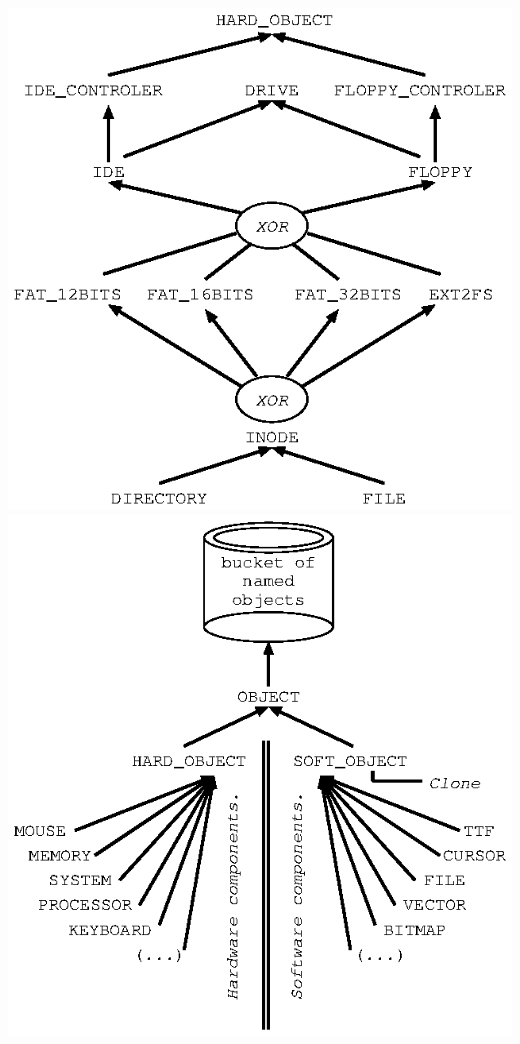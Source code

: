 \documentclass[11pt]{mybook}
\begin{document}
\begin{center}
\includegraphics[scale=1.0]{figures/design2}
\includegraphics[scale=1.0]{figures/design0}
\end{center}
\end{document}

